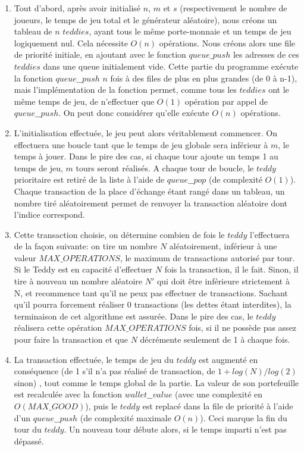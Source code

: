 \documentclass{article}
\begin{document}
\begin{enumerate}
    \item Tout d'abord, après avoir initialisé $n$, $m$ et $s$ (respectivement le nombre de joueurs, le temps de jeu total et le générateur aléatoire), nous créons un tableau de $n$ $teddies$, ayant tous le même porte-monnaie et un temps de jeu logiquement nul. Cela nécessite $O(n)$ opérations. Nous créons alors une file de priorité initiale, en ajoutant avec le fonction $queue\_push$ les adresses de ces $teddies$ dans une queue initialement vide. Cette partie du programme exécute la fonction $queue\_\_push$  $n$ fois à des files de plus en plus grandes (de 0 à n-1), mais l'implémentation de la fonction permet, comme tous les $teddies$ ont le même temps de jeu, de n'effectuer que $O(1)$ opération par appel de $queue\_\_push$. On peut donc considérer qu'elle exécute $O(n)$ opérations.
    \item L'initialisation effectuée, le jeu peut alors véritablement commencer. On effectuera une boucle tant que le temps de jeu globale sera inférieur à $m$, le temps à jouer. Dans le pire des cas, si chaque tour ajoute un temps 1 au temps de jeu, $m$ tours seront réalisés. A chaque tour de boucle, le $teddy$ prioritaire est retiré de la liste à l'aide de $queue\_\_pop$ (de complexité $O(1)$). Chaque transaction de la place d'échange étant rangé dans un tableau, un nombre tiré aléatoirement permet de renvoyer la transaction aléatoire dont l'indice correspond. 
    \item Cette transaction choisie, on détermine combien de fois le $teddy$ l'effectuera de la façon suivante: on tire un nombre $N$ aléatoirement, inférieur à une valeur $MAX\_OPERATIONS$, le maximum de transactions autorisé par tour. Si le Teddy est en capacité d'effectuer $N$ fois la transaction, il le fait. Sinon, il tire à nouveau un nombre aléatoire $N'$ qui doit être inférieure strictement à N, et recommence tant qu'il ne peux pas effectuer de transactions. Sachant qu'il pourra forcement réaliser 0 transactions (les dettes étant interdites), la terminaison de cet algorithme est assurée. Dans le pire des cas, le $teddy$ réalisera cette opération $MAX\_OPERATIONS$ fois, si il ne possède pas assez pour faire la transaction et que $N$ décrémente seulement de 1 à chaque fois.
    \item La transaction effectuée, le temps de jeu du $teddy$ est augmenté en conséquence (de 1 s'il n'a pas réalisé de transaction, de $1 + log(N) / log(2)$ sinon) , tout comme le temps global de la partie. La valeur de son portefeuille est recalculée avec la fonction $wallet\_\_value$ (avec une complexité en $O(MAX\_GOOD)$), puis le $teddy$ est replacé dans la file de priorité à l'aide d'un $queue\_\_push$ (de complexité maximale $O(n)$). Ceci marque la fin du tour du $teddy$. Un nouveau tour débute alors, si le temps imparti n'est pas dépassé.

\end{enumerate}
\end{document}
